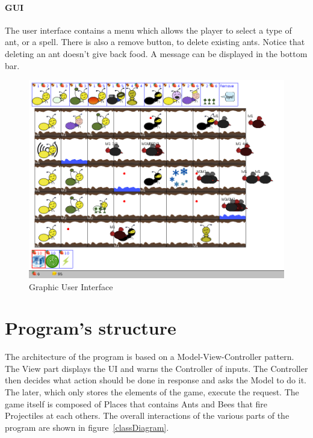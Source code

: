 \documentclass[a4paper]{article}
\begin{document}
\paragraph{GUI} The user interface contains a menu which allows the player to select a type of ant, or a spell. There is also a remove button, to delete existing ants. Notice that deleting an ant doesn't give back food. A message can be displayed in the bottom bar.

\begin{figure}[H]
	\center
	\includegraphics[scale=0.3]{screen2.png}
	\caption{Graphic User Interface}
	\label{gui}
\end{figure}


\section{Program's structure}

The architecture of the program is based on a Model-View-Controller pattern. The View part displays the UI and warns the Controller of inputs. The Controller then decides what action should be done in response and asks the Model to do it. The later, which only stores the elements of the game, execute the request.
The game itself is composed of Places that contains Ants and Bees that fire Projectiles at each others.
The overall interactions of the various parts of the program are shown in figure~\ref{classDiagram}.
\end{document}

